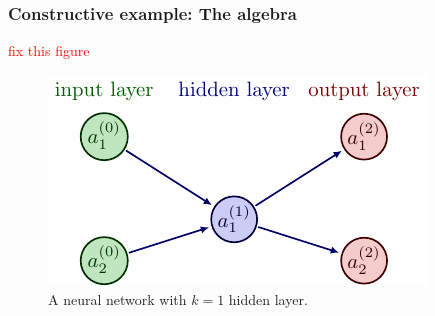 \documentclass[11pt]{article}
\begin{document}
\subsubsection{Constructive example: The algebra}

\textcolor{red}{fix this figure}

\begin{figure}[ht]
    \centering
    \includegraphics{./figures/neural_nets/MLP_2.pdf}
    \caption{A neural network with $k=1$ hidden layer.}
    \label{fig:neural_nets_simple_example}
\end{figure}
\end{document}

